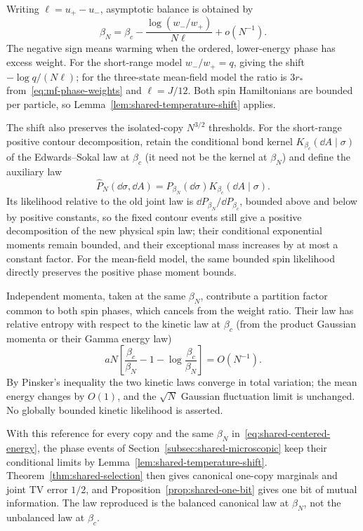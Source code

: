 Writing $\ell=u_+-u_-$, asymptotic balance is obtained by
\begin{equation}
 \beta_N=\beta_c-\frac{\log(w_-/w_+)}{N\ell}+o(N^{-1}).
 \label{eq:shared-balanced-temperature}
\end{equation}
The negative sign means warming when the ordered, lower-energy phase
has excess weight. For the short-range model $w_-/w_+=q$, giving the
shift $-\log q/(N\ell)$; for the three-state mean-field model the
ratio is $3r_*$ from~\eqref{eq:mf-phase-weights} and $\ell=J/12$.
Both spin Hamiltonians are bounded per particle, so
Lemma~\ref{lem:shared-temperature-shift} applies.

The shift also preserves the isolated-copy $N^{3/2}$ thresholds.
For the short-range positive contour decomposition, retain the
conditional bond kernel $K_{\beta_c}(\dd A\mid\sigma)$ of the
Edwards--Sokal law at $\beta_c$ (it need not be the kernel at
$\beta_N$) and define the auxiliary law
\[
 \widehat P_N(\dd\sigma,\dd A)
   =P_{\beta_N}(\dd\sigma)K_{\beta_c}(\dd A\mid\sigma).
\]
Its likelihood relative to the old joint law is
$\dd P_{\beta_N}/\dd P_{\beta_c}$, bounded above and below by positive
constants, so the fixed contour events still give a positive
decomposition of the new physical spin law; their conditional
exponential moments remain bounded, and their exceptional mass
increases by at most a constant factor. For the mean-field model, the
same bounded spin likelihood directly preserves the positive phase
moment bounds.

Independent momenta, taken at the same $\beta_N$, contribute a
partition factor common to both spin phases, which cancels from the
weight ratio. Their law has relative entropy with respect to the
kinetic law at $\beta_c$ (from the product Gaussian momenta or their
Gamma energy law)
\[
 aN\left[\frac{\beta_c}{\beta_N}-1
                     -\log\frac{\beta_c}{\beta_N}\right]=O(N^{-1}).
\]
By Pinsker's inequality the two kinetic laws converge in total
variation; the mean energy changes by $O(1)$, and the $\sqrt N$
Gaussian fluctuation limit is unchanged. No globally bounded kinetic
likelihood is asserted.

With this reference for every copy and the same $\beta_N$
in~\eqref{eq:shared-centered-energy}, the phase events of
Section~\ref{subsec:shared-microscopic} keep their conditional limits
by Lemma~\ref{lem:shared-temperature-shift}.
Theorem~\ref{thm:shared-selection} then gives canonical one-copy
marginals and joint TV error $1/2$, and
Proposition~\ref{prop:shared-one-bit} gives one bit of mutual
information. The law reproduced is the balanced canonical law at
$\beta_N$, not the unbalanced law at $\beta_c$.
